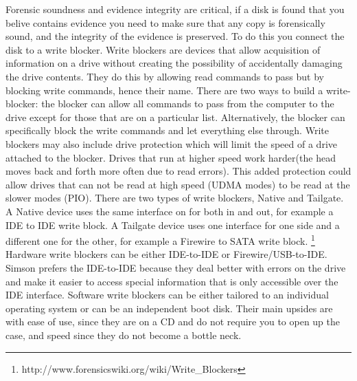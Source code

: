 Forensic soundness and evidence integrity are critical, if a disk is found that
you belive contains evidence you need to make sure that any copy is forensically
sound, and the integrity of the evidence is preserved. To do this you connect
the disk to a write blocker. Write blockers are devices that allow acquisition 
of information on a drive without creating the possibility of accidentally 
damaging the drive contents. They do this by allowing read commands to pass but 
by blocking write commands, hence their name.
There are two ways to build a write-blocker: the blocker can allow all commands 
to pass from the computer to the drive except for those that are on a particular
list. Alternatively, the blocker can specifically block the write commands and 
let everything else through.
Write blockers may also include drive protection which will limit the speed of a
drive attached to the blocker. Drives that run at higher speed work harder(the 
head moves back and forth more often due to read errors). This added protection 
could allow drives that can not be read at high speed (UDMA modes) to be read at 
the slower modes (PIO).
There are two types of write blockers, Native and Tailgate. A Native device uses 
the same interface on for both in and out, for example a IDE to IDE write block. 
A Tailgate device uses one interface for one side and a different one for the 
other, for example a Firewire to SATA write block.
\footnote{http://www.forensicswiki.org/wiki/Write\_Blockers}
Hardware write blockers can be either IDE-to-IDE or Firewire/USB-to-IDE. 
Simson prefers the IDE-to-IDE because they deal better with errors on the drive 
and make it easier to access special information that is only accessible over 
the IDE interface.
Software write blockers can be either tailored to an individual operating system
or can be an independent boot disk. Their main upsides are with ease of use, 
since they are on a CD and do not require you to open up the case, and speed 
since they do not become a bottle neck.\\

